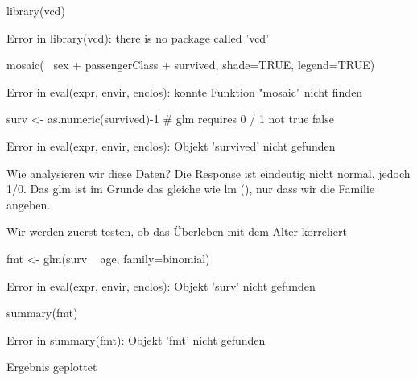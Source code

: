 \documentclass[a4paper,twoside]{tufte-book}\usepackage[]{graphicx}\usepackage[]{color}
\begin{document}
\begin{appendices}
\begin{Schunk}
\begin{Sinput}
library(vcd)
\end{Sinput}
\begin{Soutput}
Error in library(vcd): there is no package called 'vcd'
\end{Soutput}
\begin{Sinput}
mosaic(~ sex + passengerClass + survived, shade=TRUE, legend=TRUE) 
\end{Sinput}
\begin{Soutput}
Error in eval(expr, envir, enclos): konnte Funktion "mosaic" nicht finden
\end{Soutput}
\begin{Sinput}
surv <- as.numeric(survived)-1 # glm requires 0 / 1 not true false
\end{Sinput}
\begin{Soutput}
Error in eval(expr, envir, enclos): Objekt 'survived' nicht gefunden
\end{Soutput}
\end{Schunk}

Wie analysieren wir diese Daten? Die Response ist eindeutig nicht normal, jedoch 1/0. Das glm ist im Grunde das gleiche wie lm (), nur dass wir die Familie angeben.

Wir werden zuerst testen, ob das Überleben mit dem Alter korreliert

\begin{Schunk}
\begin{Sinput}
fmt <- glm(surv ~ age, family=binomial)
\end{Sinput}
\begin{Soutput}
Error in eval(expr, envir, enclos): Objekt 'surv' nicht gefunden
\end{Soutput}
\begin{Sinput}
summary(fmt)
\end{Sinput}
\begin{Soutput}
Error in summary(fmt): Objekt 'fmt' nicht gefunden
\end{Soutput}
\end{Schunk}

Ergebnis geplottet


\end{appendices}
\end{document}
